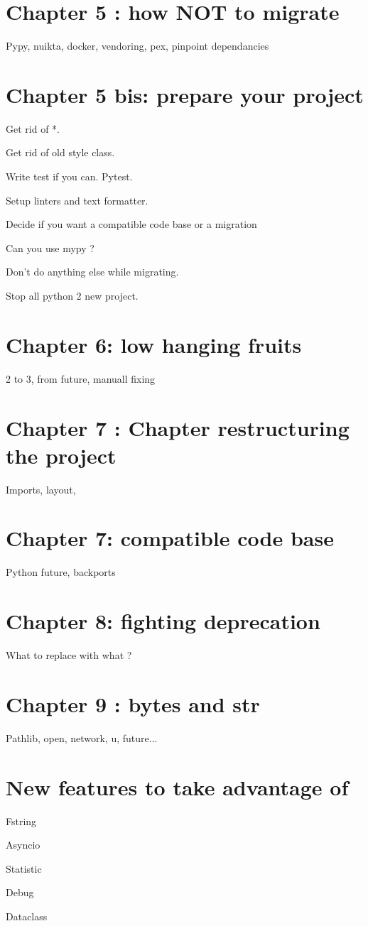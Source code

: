 \documentclass[paperwidth=8in, paperheight=10in,lang=en]{elegantbook}
\begin{document}
\chapter{Chapter 5 : how NOT to migrate}

Pypy, nuikta, docker, vendoring, pex, pinpoint dependancies

\chapter{Chapter 5 bis: prepare your project}

Get rid of *.

Get rid of old style class.

Write test if you can. Pytest.

Setup linters and text formatter.

Decide if you want a compatible code base or a migration

Can you use mypy ?

Don't do anything else while migrating.

Stop all python 2 new project.

\chapter{Chapter 6: low hanging fruits}

2 to 3, from future, manuall fixing

\chapter{Chapter 7 : Chapter restructuring the project}

Imports, layout,

\chapter{Chapter 7: compatible code base}

Python future, backports

\chapter{Chapter 8: fighting deprecation}

What to replace with what ?

\chapter{Chapter 9 : bytes and str}

Pathlib, open, network, u, future...

\chapter{New features to take advantage of}


Fstring

Asyncio

Statistic

Debug

Dataclass

\appendix

\printglossaries

\backmatter %


\end{document}
